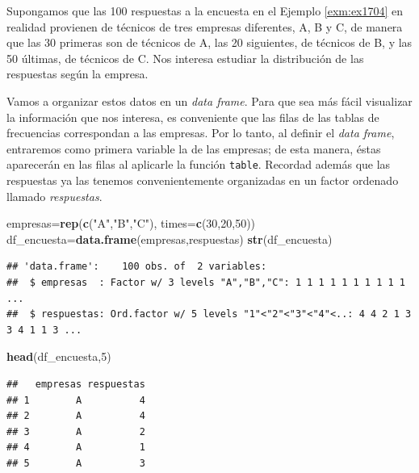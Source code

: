 \documentclass[]{book}
\newenvironment{Shaded}{\begin{snugshade}}{\end{snugshade}}
\newcommand{\DataTypeTok}[1]{\textcolor[rgb]{0.13,0.29,0.53}{#1}}
\newcommand{\DecValTok}[1]{\textcolor[rgb]{0.00,0.00,0.81}{#1}}
\newcommand{\KeywordTok}[1]{\textcolor[rgb]{0.13,0.29,0.53}{\textbf{#1}}}
\newcommand{\NormalTok}[1]{#1}
\newcommand{\StringTok}[1]{\textcolor[rgb]{0.31,0.60,0.02}{#1}}
\theoremstyle{definition}
\theoremstyle{definition}
\theoremstyle{definition}
\theoremstyle{remark}
\let\BeginKnitrBlock\begin \let\EndKnitrBlock\end
\begin{document}
\BeginKnitrBlock{example}
\protect\hypertarget{exm:encuestacum}{}{\label{exm:encuestacum} }Supongamos que las 100 respuestas a la encuesta en el Ejemplo \ref{exm:ex1704} en realidad provienen de técnicos de tres empresas diferentes, A, B y C, de manera que las 30 primeras son de técnicos de A, las 20 siguientes, de técnicos de B, y las 50 últimas, de técnicos de C. Nos interesa estudiar la distribución de las respuestas según la empresa.
\EndKnitrBlock{example}

Vamos a organizar estos datos en un \emph{data frame}. Para que sea más fácil visualizar la información que nos interesa, es conveniente que las filas de las tablas de frecuencias correspondan a las empresas. Por lo tanto, al definir el \emph{data frame}, entraremos como primera variable la de las empresas; de esta manera, éstas aparecerán en las filas al aplicarle la función \texttt{table}. Recordad además que las respuestas ya las tenemos convenientemente organizadas en un factor ordenado llamado \emph{respuestas}.

\begin{Shaded}
\begin{Highlighting}[]
\NormalTok{empresas=}\KeywordTok{rep}\NormalTok{(}\KeywordTok{c}\NormalTok{(}\StringTok{"A"}\NormalTok{,}\StringTok{"B"}\NormalTok{,}\StringTok{"C"}\NormalTok{), }\DataTypeTok{times=}\KeywordTok{c}\NormalTok{(}\DecValTok{30}\NormalTok{,}\DecValTok{20}\NormalTok{,}\DecValTok{50}\NormalTok{))}
\NormalTok{df_encuesta=}\KeywordTok{data.frame}\NormalTok{(empresas,respuestas)}
\KeywordTok{str}\NormalTok{(df_encuesta)}
\end{Highlighting}
\end{Shaded}

\begin{verbatim}
## 'data.frame':    100 obs. of  2 variables:
##  $ empresas  : Factor w/ 3 levels "A","B","C": 1 1 1 1 1 1 1 1 1 1 ...
##  $ respuestas: Ord.factor w/ 5 levels "1"<"2"<"3"<"4"<..: 4 4 2 1 3 3 4 1 1 3 ...
\end{verbatim}

\begin{Shaded}
\begin{Highlighting}[]
\KeywordTok{head}\NormalTok{(df_encuesta,}\DecValTok{5}\NormalTok{)}
\end{Highlighting}
\end{Shaded}

\begin{verbatim}
##   empresas respuestas
## 1        A          4
## 2        A          4
## 3        A          2
## 4        A          1
## 5        A          3
\end{verbatim}
\end{document}

